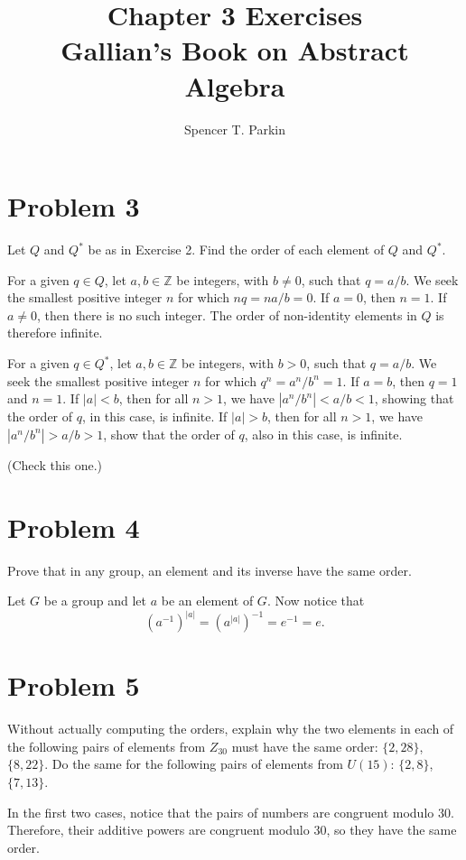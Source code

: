 \documentclass[12pt]{article}
\title{Chapter 3 Exercises\\Gallian's Book on Abstract Algebra}
\author{Spencer T. Parkin}
\newcommand{\Z}{\mathbb{Z}}
\begin{document}
\maketitle

\section*{Problem 3}

Let $Q$ and $Q^*$ be as in Exercise 2.  Find the order of each element of $Q$ and $Q^*$.

For a given $q\in Q$, let $a,b\in\Z$ be integers, with $b\neq 0$, such that $q=a/b$.
We seek the smallest positive integer $n$ for which $nq=na/b=0$.
If $a=0$, then $n=1$.  If $a\neq 0$, then there is no such integer.
The order of non-identity elements in $Q$ is therefore infinite.

For a given $q\in Q^*$, let $a,b\in\Z$ be integers, with $b>0$, such that $q=a/b$.
We seek the smallest positive integer $n$ for which $q^n=a^n/b^n=1$.
If $a=b$, then $q=1$ and $n=1$.  If $|a|<b$, then for all $n>1$, we have
$|a^n/b^n|<a/b<1$, showing that the order of $q$, in this case, is infinite.
If $|a|>b$, then for all $n>1$, we have $|a^n/b^n|>a/b>1$, show that
the order of $q$, also in this case, is infinite.

(Check this one.)

\section*{Problem 4}

Prove that in any group, an element and its inverse have the same order.

Let $G$ be a group and let $a$ be an element of $G$.  Now notice that
\begin{equation*}
(a^{-1})^{|a|} = (a^{|a|})^{-1} = e^{-1} = e.
\end{equation*}

\section*{Problem 5}

Without actually computing the orders, explain why the two elements in each
of the following pairs of elements from $Z_{30}$ must have the same
order: $\{2,28\}$, $\{8,22\}$.  Do the same for the following pairs of
elements from $U(15)$: $\{2,8\}$, $\{7,13\}$.

In the first two cases, notice that the pairs of numbers are congruent modulo 30.
Therefore, their additive powers are congruent modulo 30, so they have the same order.
\end{document}

